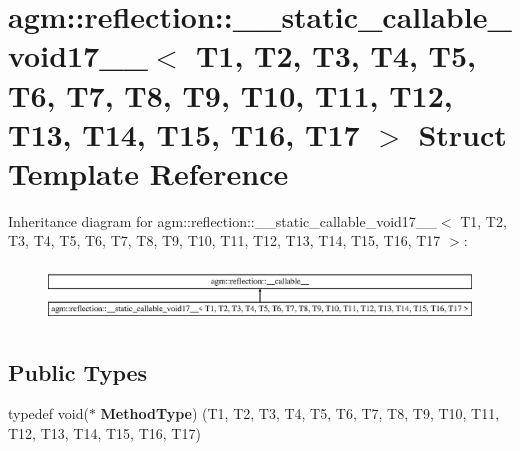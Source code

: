 \hypertarget{structagm_1_1reflection_1_1____static__callable__void17____}{}\section{agm\+:\+:reflection\+:\+:\+\_\+\+\_\+static\+\_\+callable\+\_\+void17\+\_\+\+\_\+$<$ T1, T2, T3, T4, T5, T6, T7, T8, T9, T10, T11, T12, T13, T14, T15, T16, T17 $>$ Struct Template Reference}
\label{structagm_1_1reflection_1_1____static__callable__void17____}
Inheritance diagram for agm\+:\+:reflection\+:\+:\+\_\+\+\_\+static\+\_\+callable\+\_\+void17\+\_\+\+\_\+$<$ T1, T2, T3, T4, T5, T6, T7, T8, T9, T10, T11, T12, T13, T14, T15, T16, T17 $>$\+:\begin{figure}[H]
\begin{center}
\leavevmode
\includegraphics[height=1.549101cm]{structagm_1_1reflection_1_1____static__callable__void17____}
\end{center}
\end{figure}
\subsection*{Public Types}
\begin{DoxyCompactItemize}
\item 
typedef void($\ast$ {\bfseries Method\+Type}) (T1, T2, T3, T4, T5, T6, T7, T8, T9, T10, T11, T12, T13, T14, T15, T16, T17)\hypertarget{structagm_1_1reflection_1_1____static__callable__void17_____a10609f87a6ed89dee57fc9a858c48f63}{}\label{structagm_1_1reflection_1_1____static__callable__void17_____a10609f87a6ed89dee57fc9a858c48f63}

\end{DoxyCompactItemize}
